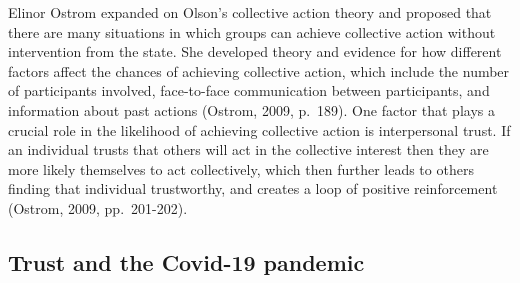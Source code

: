 \documentclass[
  12pt,
]{article}
\begin{document}
Elinor Ostrom expanded on Olson's collective action theory and proposed that there are many situations in which groups can achieve collective action without intervention from the state. She developed theory and evidence for how different factors affect the chances of achieving collective action, which include the number of participants involved, face-to-face communication between participants, and information about past actions (Ostrom, 2009, p.~189). One factor that plays a crucial role in the likelihood of achieving collective action is interpersonal trust. If an individual trusts that others will act in the collective interest then they are more likely themselves to act collectively, which then further leads to others finding that individual trustworthy, and creates a loop of positive reinforcement (Ostrom, 2009, pp.~201-202).\\

\hypertarget{trust-and-the-covid-19-pandemic}{%
\subsection{Trust and the Covid-19 pandemic}\label{trust-and-the-covid-19-pandemic}}
\end{document}
